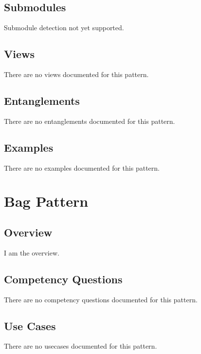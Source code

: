 \subsection{Submodules}
\label{ssec:submodules}
Submodule detection not yet supported.

\subsection{Views}
\label{ssec:views}
There are no views documented for this pattern.


\subsection{Entanglements}
\label{ssec:entanglements}
There are no entanglements documented for this pattern.

\subsection{Examples}
\label{ssec:examples}
There are no examples documented for this pattern.


\section{Bag Pattern}
\label{sec:bag-pattern}
\subsection{Overview}
\label{ssec:overview}
I am the overview.

\subsection{Competency Questions}
\label{ssec:cqs}
There are no competency questions documented for this pattern.

\subsection{Use Cases}
\label{ssec:use-cases}
There are no usecases documented for this pattern.
